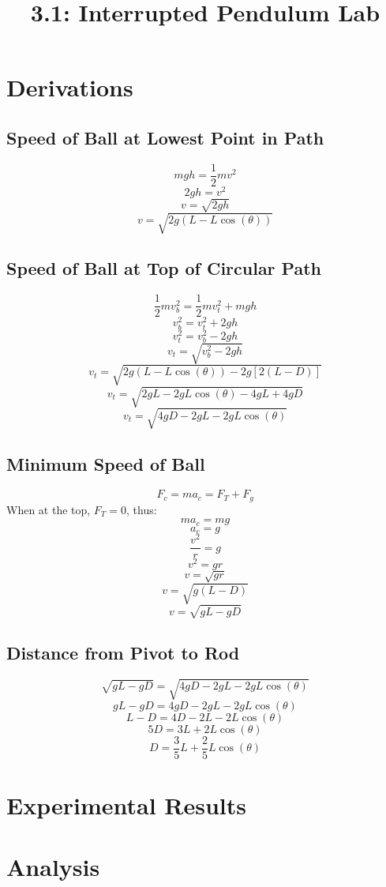 \documentclass{article}
\title{3.1: Interrupted Pendulum Lab}
\begin{document}
\section{Derivations}
\subsection{Speed of Ball at Lowest Point in Path}
\[mgh = \frac{1}{2}mv^2\]
\[2gh = v^2\]
\[v = \sqrt{2gh}\]
\[v = \sqrt{2g(L - L\cos(\theta))}\]
\subsection{Speed of Ball at Top of Circular Path}
\[\frac{1}{2}mv_b^2 = \frac{1}{2}mv_t^2 + mgh\]
\[v_b^2 = v_t^2 + 2gh\]
\[v_t^2 = v_b^2 - 2gh\]
\[v_t = \sqrt{v_b^2 - 2gh}\]
\[v_t = \sqrt{2g(L - L\cos(\theta)) - 2g[2(L - D)]}\]
\[v_t = \sqrt{2gL - 2gL\cos(\theta) - 4gL + 4gD}\]
\[v_t = \sqrt{4gD - 2gL - 2gL\cos(\theta)}\]
\subsection{Minimum Speed of Ball}
\[F_c = ma_c = F_T + F_g\]
When at the top, $F_T = 0$, thus:
\[ma_c = mg\]
\[a_c = g\]
\[\frac{v^2}{r} = g\]
\[v^2 = gr\]
\[v = \sqrt{gr}\]
\[v = \sqrt{g(L - D)}\]
\[v = \sqrt{gL - gD}\]
\subsection{Distance from Pivot to Rod}
\[\sqrt{gL - gD} = \sqrt{4gD - 2gL - 2gL\cos(\theta)}\]
\[gL - gD = 4gD - 2gL - 2gL\cos(\theta)\]
\[L - D = 4D - 2L - 2L\cos(\theta)\]
\[5D = 3L + 2L\cos(\theta)\]
\[D = \frac{3}{5}L + \frac{2}{5}L\cos(\theta)\]
\section{Experimental Results}
\begin{center}
\end{center}
\section{Analysis}
\end{document}
